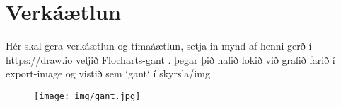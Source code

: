 \section{Verkáætlun}
Hér skal gera verkáætlun og tímaáætlun, setja in mynd af henni gerð í https://draw.io veljið Flocharts-gant .  þegar þið hafið lokið við grafið farið í export-image og vistið sem `gant` í skyrsla/img
\begin{figure}[h]
\texttt{[image: img/gant.jpg]}
\end{figure}